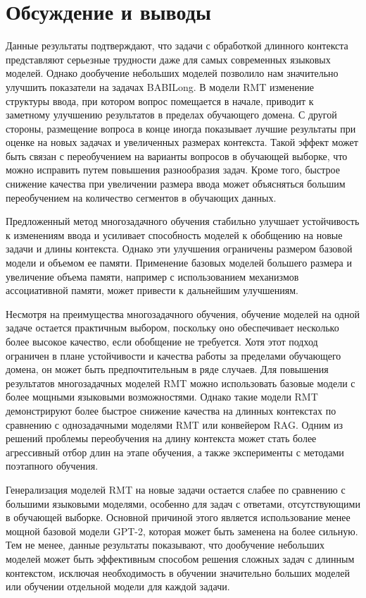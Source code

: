 \section{Обсуждение и выводы}

Данные результаты подтверждают, что задачи с обработкой длинного контекста представляют серьезные трудности даже для самых современных языковых моделей. Однако дообучение небольших моделей позволило нам значительно улучшить показатели на задачах BABILong. В модели RMT изменение структуры ввода, при котором вопрос помещается в начале, приводит к заметному улучшению результатов в пределах обучающего домена. С другой стороны, размещение вопроса в конце иногда показывает лучшие результаты при оценке на новых задачах и увеличенных размерах контекста. Такой эффект может быть связан с переобучением на варианты вопросов в обучающей выборке, что можно исправить путем повышения разнообразия задач. Кроме того, быстрое снижение качества при увеличении размера ввода может объясняться большим переобучением на количество сегментов в обучающих данных.

Предложенный метод многозадачного обучения стабильно улучшает устойчивость к изменениям ввода и усиливает способность моделей к обобщению на новые задачи и длины контекста. Однако эти улучшения ограничены размером базовой модели и объемом ее памяти. Применение базовых моделей большего размера и увеличение объема памяти, например с использованием механизмов ассоциативной памяти, может привести к дальнейшим улучшениям.

Несмотря на преимущества многозадачного обучения, обучение моделей на одной задаче остается практичным выбором, поскольку оно обеспечивает несколько более высокое качество, если обобщение не требуется. Хотя этот подход ограничен в плане устойчивости и качества работы за пределами обучающего домена, он может быть предпочтительным в ряде случаев. Для повышения результатов многозадачных моделей RMT можно использовать базовые модели с более мощными языковыми возможностями. Однако такие модели RMT демонстрируют более быстрое снижение качества на длинных контекстах по сравнению с однозадачными моделями RMT или конвейером RAG. Одним из решений проблемы переобучения на длину контекста может стать более агрессивный отбор длин на этапе обучения, а также эксперименты с методами поэтапного обучения.

Генерализация моделей RMT на новые задачи остается слабее по сравнению с большими языковыми моделями, особенно для задач с ответами, отсутствующими в обучающей выборке. Основной причиной этого является использование менее мощной базовой модели GPT-2, которая может быть заменена на более сильную. Тем не менее, данные результаты показывают, что дообучение небольших моделей может быть эффективным способом решения сложных задач с длинным контекстом, исключая необходимость в обучении значительно больших моделей или обучении отдельной модели для каждой задачи.